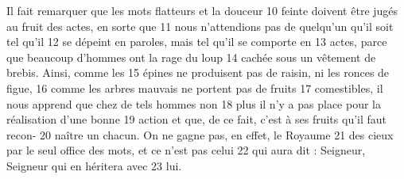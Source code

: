 Il fait remarquer que les mots flatteurs et la douceur	 
10	 	feinte doivent être jugés au fruit des actes, en sorte que	 
11	 	nous n'attendions pas de quelqu'un qu'il soit tel qu'il	 
12	 	se dépeint en paroles, mais tel qu'il se comporte en	 
13	 	actes, parce que beaucoup d'hommes ont la rage du loup	 
14	 	cachée sous un vêtement de brebis. Ainsi, comme les	 
15	 	épines ne produisent pas de raisin, ni les ronces de figue,	 
16	 	comme les arbres mauvais ne portent pas de fruits	 
17	 	comestibles, il nous apprend que chez de tels hommes non	 
18	 	plus il n'y a pas place pour la réalisation d'une bonne	 
19	 	action et que, de ce fait, c'est à ses fruits qu'il faut recon-	 
20	 	naître un chacun. On ne gagne pas, en effet, le Royaume	 
21	 	des cieux par le seul office des mots, et ce n'est pas celui	 
22	 	qui aura dit : Seigneur, Seigneur qui en héritera avec	 
23	 	lui.